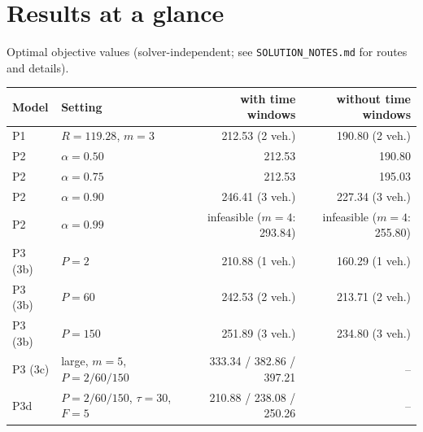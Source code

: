 \documentclass[11pt,a4paper]{article}
\theoremstyle{definition}
\begin{document}
\section{Results at a glance}
Optimal objective values (solver-independent; see \texttt{SOLUTION\_NOTES.md} for routes and details).
\begin{table}[H]
\centering\footnotesize
\begin{tabular}{@{}llrr@{}}
\toprule
Model & Setting & with time windows & without time windows\\
\midrule
P1 & $R=119.28$, $m=3$ & 212.53 (2 veh.) & 190.80 (2 veh.)\\
P2 & $\alpha=0.50$ & 212.53 & 190.80\\
P2 & $\alpha=0.75$ & 212.53 & 195.03\\
P2 & $\alpha=0.90$ & 246.41 (3 veh.) & 227.34 (3 veh.)\\
P2 & $\alpha=0.99$ & infeasible ($m=4$: 293.84) & infeasible ($m=4$: 255.80)\\
\midrule
P3 (3b) & $P=2$ & 210.88 (1 veh.) & 160.29 (1 veh.)\\
P3 (3b) & $P=60$ & 242.53 (2 veh.) & 213.71 (2 veh.)\\
P3 (3b) & $P=150$ & 251.89 (3 veh.) & 234.80 (3 veh.)\\
\midrule
P3 (3c) & large, $m=5$, $P=2/60/150$ & 333.34 / 382.86 / 397.21 & --\\
P3d & $P=2/60/150$, $\tau=30$, $F=5$ & 210.88 / 238.08 / 250.26 & --\\
\bottomrule
\end{tabular}
\end{table}
\end{document}
